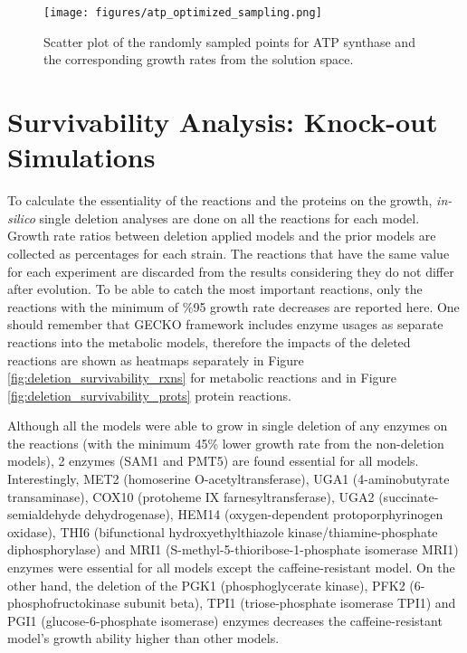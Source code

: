  \begin{figure}[H]
   \begin{center}
   \texttt{[image: figures/atp\_optimized\_sampling.png]}
   \caption[Scatter plot of the randomly sampled points for ATP synthase and the corresponding growth rates from the solution space.]{Scatter plot of the randomly sampled points for ATP synthase and the corresponding growth rates from the solution space.}
   \label{fig:bi_level}
   \end{center}
 \end{figure}

\vspace{-1cm}

\section{Survivability Analysis: Knock-out Simulations}
To calculate the essentiality of the reactions and the proteins on the growth, \emph{in-silico} single deletion analyses are done on all the reactions for each model. Growth rate ratios between deletion applied models and the prior models are collected as percentages for each strain. The reactions that have the same value for each experiment are discarded from the results considering they do not differ after evolution. To be able to catch the most important reactions, only the reactions with the minimum of \%95 growth rate decreases are reported here. One should remember that GECKO framework includes enzyme usages as separate reactions into the metabolic models, therefore the impacts of the deleted reactions are shown as heatmaps separately in Figure \ref{fig:deletion_survivability_rxns} for metabolic reactions and in Figure \ref{fig:deletion_survivability_prots} protein reactions.

Although all the models were able to grow in single deletion of any enzymes on the reactions (with the minimum 45\% lower growth rate from the non-deletion models), 2 enzymes (SAM1 and PMT5) are found essential for all models. Interestingly, MET2 (homoserine O-acetyltransferase), UGA1 (4-aminobutyrate transaminase), COX10 (protoheme IX farnesyltransferase), UGA2 (succinate-semialdehyde dehydrogenase), HEM14 (oxygen-dependent protoporphyrinogen oxidase), THI6 (bifunctional hydroxyethylthiazole kinase/thiamine-phosphate diphosphorylase) and MRI1 (S-methyl-5-thioribose-1-phosphate isomerase MRI1) enzymes were essential for all models except the caffeine-resistant model. On the other hand, the deletion of the PGK1 (phosphoglycerate kinase), PFK2 (6-phosphofructokinase subunit beta), TPI1 (triose-phosphate isomerase TPI1) and PGI1 (glucose-6-phosphate isomerase) enzymes decreases the caffeine-resistant model's growth ability higher than other models.

